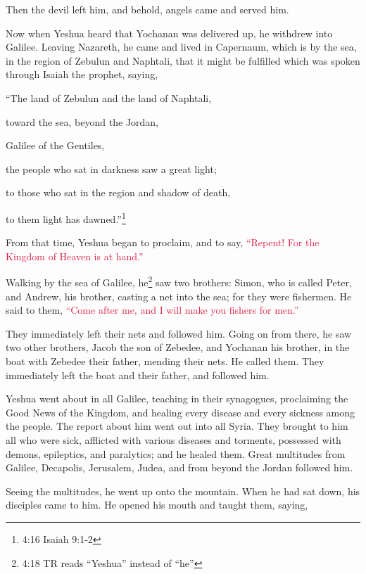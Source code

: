 \myverse{}Then the devil left him, and behold, angels came and served him.

\myverse{}Now when Yeshua heard that Yochanan was delivered up, he withdrew
into Galilee.
\myverse{}Leaving Nazareth, he came and lived in Capernaum, which is by the sea, in
the region of Zebulun and Naphtali,
\myverse{}that it might be fulfilled which was spoken through Isaiah the prophet, saying,

\myverse{}“The land of Zebulun and the land of Naphtali,

toward the sea, beyond the Jordan,

Galilee of the Gentiles,

\myverse{}the people who sat in darkness saw a great light;

to those who sat in the region and shadow of death,

to them light has dawned.”\footnote{4:16 Isaiah 9:1-2}

\myverse{}From that time, Yeshua began to proclaim, and to say,
\textcolor{crimson}{“Repent! For the Kingdom of Heaven is at hand.”}

\myverse{}Walking by the sea of Galilee, he\footnote{4:18 TR reads “Yeshua” instead of “he”
} saw two brothers: Simon, who is called Peter, and Andrew, his brother, casting a net into the
sea; for they were fishermen.
\myverse{}He said to them,
\textcolor{crimson}{“Come after me, and I will make you fishers for men.”}

\myverse{}They immediately left their nets and followed him.
\myverse{}Going on from there, he saw two other brothers, Jacob the son of Zebedee,
and Yochanan his brother, in the boat with Zebedee their father, mending their nets. He called them.
\myverse{}They immediately left the boat and their father, and followed him.

\myverse{}Yeshua went about in all Galilee, teaching in their synagogues,
proclaiming the Good News of the Kingdom, and healing every disease and every sickness among the people.
\myverse{}The report about him went out into all Syria. They brought to him all who
were sick, afflicted with various diseases and torments, possessed with demons, epileptics, and paralytics;
and he healed them.
\myverse{}Great multitudes from Galilee, Decapolis, Jerusalem, Judea, and from beyond
the Jordan followed him.


\mychapter{} \myverse*{}Seeing the multitudes, he went up onto the mountain. When he had
sat down, his disciples came to him.
\myverse{}He opened his mouth and taught them, saying,

